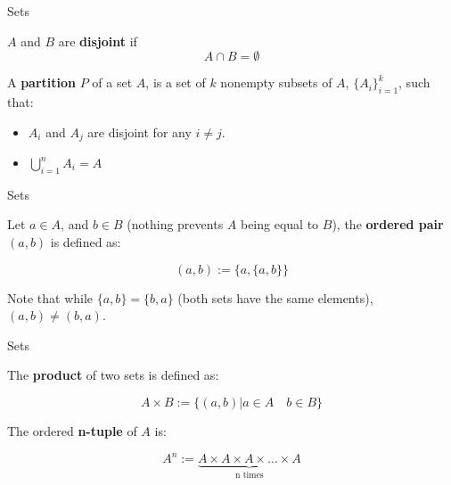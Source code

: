 \documentclass[aspectratio=169]{beamer}
\begin{document}
\begin{frame}{Sets}
    \begin{definition}
    $A$ and $B$ are \textbf{disjoint} if $$A\cap B=\emptyset$$
    \end{definition}
    
    \begin{definition}
    
    A \textbf{partition} $P$ of a set $A$, is a set of $k$ nonempty subsets of $A$, $\{A_i\}_{i=1}^{k}$, such that:
    
    \begin{itemize}
        \item $A_i$ and $A_j$ are disjoint for any $i\neq j$.
        \item $\bigcup_{i=1}^{n}A_i=A$
    \end{itemize}
    
    
    \end{definition}
    
\end{frame}
\begin{frame}{Sets}
    \begin{definition}
    Let $a\in A$, and $b\in B$ (nothing prevents $A$ being equal to $B$), the \textbf{ordered pair} $(a,b)$ is defined as:
    
    $$(a,b):=\{a,\{a,b\}\}$$
    
    \end{definition}
    
    Note that while $\{a,b\}=\{b,a\}$ (both sets have the same elements), $(a,b)\neq(b,a)$.
\end{frame}

\begin{frame}{Sets}
    \begin{definition}
    The \textbf{product} of two sets is defined as:
    
    $$A\times B:=\{(a,b)| a\in A\quad b\in B\}$$
    \end{definition}
    
    \begin{definition}
        The ordered \textbf{n-tuple} of $A$ is:
        
        $$A^n := \underbrace{A\times A\times A \times\ldots\times A}_{\text{n times}}$$
    \end{definition}
\end{frame}
\end{document}
